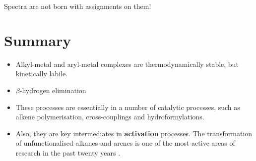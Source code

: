 \documentclass[a4paper]{tufte-handout}
\begin{document}
Spectra are not born with assignments on them!

\section{Summary}

\begin{itemize}
  \item Alkyl-metal and aryl-metal complexes are thermodynamically stable, but kinetically labile.
  \item $\beta$-hydrogen elimination 
  \item These processes are essentially in a number of catalytic processes, such as alkene polymerisation, cross-couplings and hydroformylations.
  \item Also, they are key intermediates in \textbf{ activation} processes. The transformation of unfunctionalised alkanes and arenes is one of the most active areas of research in the past twenty years \cite{guillemard2021late}.
\end{itemize}



\end{document}
